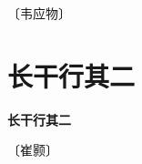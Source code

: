 \documentclass[12pt,UTF-8,openany,fontset=none]{ctexbook}
\begin{document}
\begin{center}
    \vspace{10pt}
    
    \begin{large}
        
        〔韦应物〕
        
    \end{large}
    
    \vspace{8pt}
    
    \begin{huge}
        
        \phantom{。}

        \phantom{。}
        
        \phantom{。}

        \phantom{。}
        
    \end{huge}
    
\end{center}

\vspace{8pt}
\clearpage

\section{长干行其二}



\begin{center}
    {\bfseries 长干行其二}
\end{center}

\begin{center}
    \vspace{10pt}
    
    \begin{large}
        
        〔崔颢〕
        
    \end{large}
    
    \vspace{8pt}
    
    \begin{huge}
        
        
        
        ~~
        
        
    \end{huge}
    
\end{center}
\end{document}

